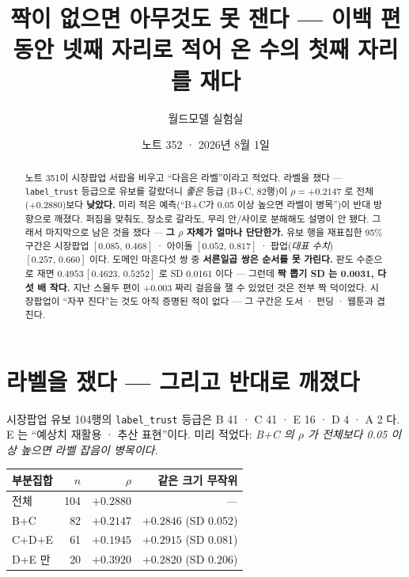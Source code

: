 \documentclass[11pt]{article}
\begin{document}
\title{짝이 없으면 아무것도 못 잰다 --- 이백 편 동안 넷째 자리로 적어 온 수의 첫째 자리를 재다}
\author{월드모델 실험실}
\date{노트 352 · 2026년 8월 1일}
\maketitle

\begin{abstract}
노트 351이 시장팝업 서랍을 비우고 ``다음은 라벨''이라고 적었다. 라벨을
쟀다 --- \texttt{label\_trust} 등급으로 유보를 갈랐더니 \emph{좋은} 등급
(B+C, 82행)이 $\rho=+0.2147$ 로 전체(+0.2880)보다 \textbf{낮았다.}
미리 적은 예측(``B+C가 0.05 이상 높으면 라벨이 병목'')이 반대 방향으로
깨졌다. 퍼짐을 맞춰도, 장소로 갈라도, 무리 안/사이로 분해해도 설명이
안 됐다. 그래서 마지막으로 남은 것을 쟀다 --- \textbf{그 $\rho$ 자체가
얼마나 단단한가.} 유보 행을 재표집한 95\% 구간은 시장팝업
$[0.085,\,0.468]$ · 아이돌 $[0.052,\,0.817]$ · 팝업(\emph{대표 수치})
$[0.257,\,0.660]$ 이다. 도메인 마흔다섯 쌍 중 \textbf{서른일곱 쌍은 순서를
못 가린다.} 판도 수준으로 재면 $0.4953\,[0.4623,\,0.5252]$ 로 SD 0.0161
이다 --- 그런데 \textbf{짝 뽑기 SD 는 0.0031, 다섯 배 작다.} 지난
스물두 편이 +0.003 짜리 걸음을 잴 수 있었던 것은 전부 짝 덕이었다.
시장팝업이 ``자꾸 진다''는 것도 아직 증명된 적이 없다 --- 그 구간은
도서 · 펀딩 · 웹툰과 겹친다.
\end{abstract}

\section{라벨을 쟀다 --- 그리고 반대로 깨졌다}

시장팝업 유보 104행의 \texttt{label\_trust} 등급은 B 41 · C 41 · E 16 ·
D 4 · A 2 다. E 는 ``예상치 재활용 · 추산 표현''이다. 미리 적었다:
\emph{B+C 의 $\rho$ 가 전체보다 0.05 이상 높으면 라벨 잡음이 병목이다.}

\begin{center}
\begin{tabular}{lrrr}
\hline
부분집합 & $n$ & $\rho$ & 같은 크기 무작위 \\
\hline
전체        & 104 & $+0.2880$ & --- \\
B+C         &  82 & $+0.2147$ & $+0.2846$ (SD 0.052) \\
C+D+E       &  61 & $+0.1945$ & $+0.2915$ (SD 0.081) \\
D+E 만      &  20 & $+0.3920$ & $+0.2820$ (SD 0.206) \\
\hline
\end{tabular}
\end{center}
\end{document}
